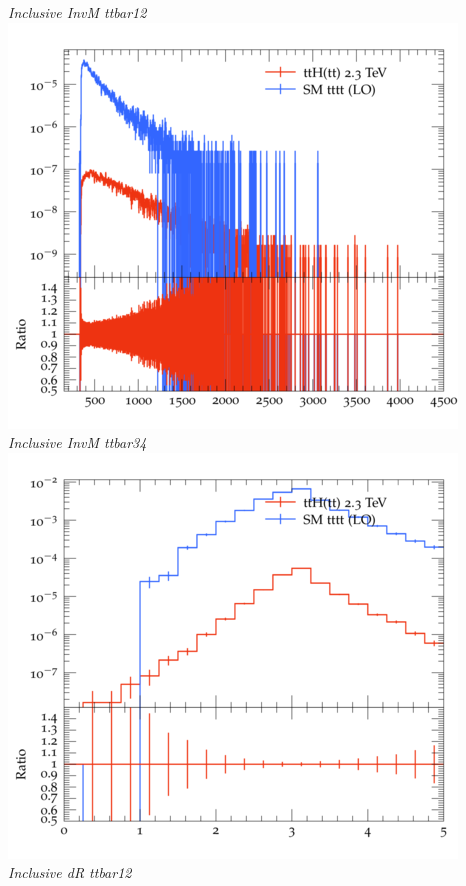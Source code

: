 \documentclass{beamer}
\begin{document}
\begin{frame}
\begin{columns}
\textit{\small Inclusive InvM ttbar12}
\includegraphics[width=\textwidth]{../plots/ttH_2300/tttt_ttH/Inclusive_InvM_ttbar34.png}\\
\textit{\small Inclusive InvM ttbar34}
\includegraphics[width=\textwidth]{../plots/ttH_2300/tttt_ttH/Inclusive_dR_ttbar12.png}\\
\textit{\small Inclusive dR ttbar12}
\end{columns}
\end{frame}
\end{document}
